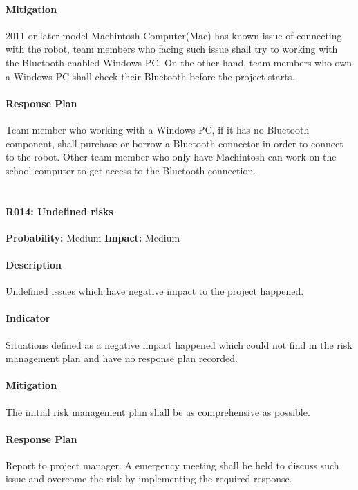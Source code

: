 \documentclass[11pt, a4paper]{report}
\begin{document}
	\paragraph{Mitigation}2011 or later model Machintosh Computer(Mac) has known issue of connecting with the robot, team members who facing such issue shall try to working with the Bluetooth-enabled Windows PC. On the other hand, team members who own a Windows PC shall check their Bluetooth before the project starts. 
	\paragraph{Response Plan}Team member who working with a Windows PC, if it has no Bluetooth component, shall purchase or borrow a Bluetooth connector in order to connect to the robot. Other team member who only have Machintosh can work on the school computer to get access to the Bluetooth connection.\\\\

\pagebreak

	\paragraph{R014: Undefined risks} \hspace{1cm} \textbf{Probability: }Medium\hspace{1cm}   \textbf{Impact: }Medium
	\paragraph{Description}Undefined issues which have negative impact to the project happened.
	\paragraph{Indicator}Situations defined as a negative impact happened which could not find in the risk management plan and have no response plan recorded.
	\paragraph{Mitigation}The initial risk management plan shall be as comprehensive as possible.
	\paragraph{Response Plan}Report to project manager. A emergency meeting shall be held to discuss such issue and overcome the risk by implementing the required response.  \\\\
\end{document}

